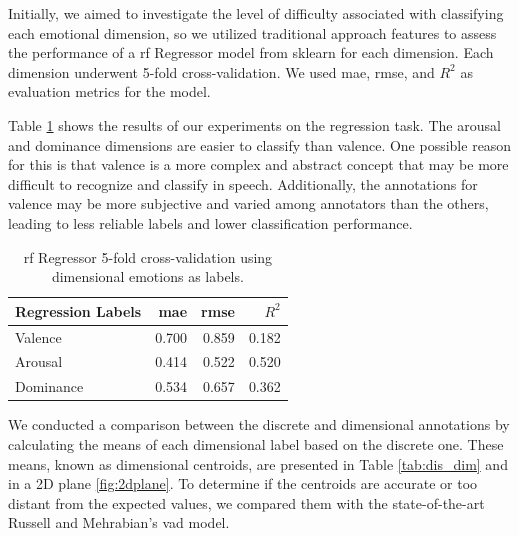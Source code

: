 Initially, we aimed to investigate the level of difficulty associated with classifying each emotional dimension, so we utilized traditional approach features to assess the performance of a \ac{rf} Regressor model from sklearn for each dimension. Each dimension underwent 5-fold cross-validation. We used \ac{mae}, \ac{rmse}, and $R^2$ as evaluation metrics for the model.

Table \ref{tab:dim_reg} shows the results of our experiments on the regression task. The arousal and dominance dimensions are easier to classify than valence. One possible reason for this is that valence is a more complex and abstract concept that may be more difficult to recognize and classify in speech. Additionally, the annotations for valence may be more subjective and varied among annotators than the others, leading to less reliable labels and lower classification performance.


\begin{table}[H]
	\centering
	\caption{\ac{rf} Regressor 5-fold cross-validation using dimensional emotions as labels.}
	\label{tab:dim_reg}
	\begin{tabular}{lrrr}
		\toprule
		Regression Labels   &   \ac{mae} &  \ac{rmse} & $R^2$ \\
		\midrule
		Valence             & 0.700 & 0.859 & 0.182 \\
		Arousal             & 0.414 & 0.522 & 0.520 \\
		Dominance           & 0.534 & 0.657 & 0.362 \\
		\bottomrule
	\end{tabular}
\end{table}

We conducted a comparison between the discrete and dimensional annotations by calculating the means of each dimensional label based on the discrete one. These means, known as dimensional centroids, are presented in Table \ref{tab:dis_dim} and in a 2D plane \ref{fig:2dplane}. To determine if the centroids are accurate or too distant from the expected values, we compared them with the state-of-the-art Russell and Mehrabian's \ac{vad} model.

